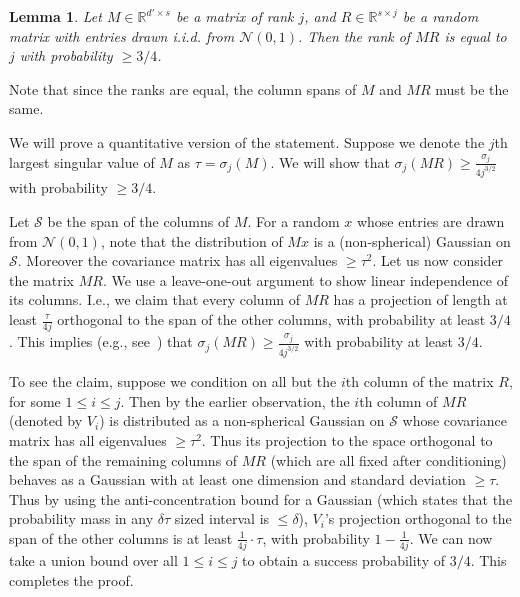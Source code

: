 \documentclass[11pt]{article}
\makeatletter
\theoremstyle{plain}
\newtheorem{lemma}[theorem]{Lemma}
\theoremstyle{plain}
\theoremstyle{definition}
\theoremstyle{plain}
\theoremstyle{remark}
\newenvironment{proof}[1][\protect\proofname]{\par
	\normalfont\topsep6\p@\@plus6\p@\relax
	\trivlist
	\itemindent\parindent
	\item[\hskip\labelsep\scshape #1]\ignorespaces
}{\endtrivlist\@endpefalse
}
\providecommand{\proofname}{Proof}
\newcommand{\RR}{\mathbb{R}}
\newcommand{\cN}{\mathcal{N}}
\newcommand{\cS}{\mathcal{S}}
\makeatother
\begin{document}
\begin{lemma}
\label{lem:rand_rotation}
    Let $M\in \RR^{d' \times s}$ be a matrix of rank $j$, and $R\in \RR^{s\times j}$ be a random matrix with entries drawn i.i.d. from $\mathcal{N}(0,1)$. Then the rank of $MR$ is equal to $j$ with probability $\ge 3/4$.
\end{lemma}
Note that since the ranks are equal, the column spans of $M$ and $MR$ must be the same.
\begin{proof}
We will prove a quantitative version of the statement. Suppose we denote the $j$th largest singular value of $M$ as $\tau = \sigma_j (M)$.  We will show that $\sigma_j (MR) \ge \frac{\sigma_j}{4 j^{3/2}}$ with probability $\ge 3/4$. 

Let $\cS$ be the span of the columns of $M$. For a random $x$ whose entries are drawn from $\cN(0,1)$, note that the distribution of $Mx$ is a (non-spherical) Gaussian on $\cS$. Moreover the covariance matrix has all eigenvalues $\ge \tau^2$. Let us now consider the matrix $MR$. We use a leave-one-out argument to show linear independence of its columns. I.e., we claim that every column of $MR$ has a projection of length at least $\frac{\tau}{4 j}$ orthogonal to the span of the other columns, with probability at least $3/4$. This implies (e.g., see~\cite{rudelson2009smallestsingularvaluerandom}) that $\sigma_j (MR) \ge  \frac{\sigma_j}{4 j^{3/2}}$ with probability at least $3/4$.

To see the claim, suppose we condition on all but the $i$th column of the matrix $R$, for some $1\le i\le j$. Then by the earlier observation, the $i$th column of $MR$  (denoted by $V_i$) is distributed as a non-spherical Gaussian on $\cS$ whose covariance matrix has all eigenvalues $\ge \tau^2$. Thus its projection to the space orthogonal to the span of the remaining columns of $MR$ (which are all fixed after conditioning) behaves as a Gaussian with at least one dimension and standard deviation $\ge \tau$. Thus by using the anti-concentration bound for a Gaussian (which states that the probability mass in any $\delta \tau$ sized interval is $\le \delta$), $V_i$'s projection orthogonal to the span of the other columns is at least $\frac{1}{4j} \cdot \tau$, with probability $1- \frac{1}{4 j}$. We can now take a union bound over all $1 \le i \le j$ to obtain a success probability of $3/4$. This completes the proof.
\end{proof}
\end{document}
